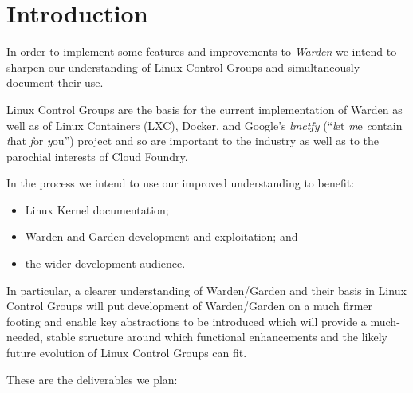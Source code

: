 \documentclass[a4paper,twoside,12pt]{article}
\begin{document}
\section{Introduction}

In order to implement some features and improvements to \emph{Warden} we intend to sharpen our understanding of Linux Control Groups and simultaneously document their use.

Linux Control Groups are the basis for the current implementation of Warden as well as of Linux Containers (LXC), Docker, and Google's
\textit{lmctfy} (``\emph{l}et \emph{m}e \emph{c}ontain \emph{t}hat \emph{f}or \emph{y}ou'') project and so are important to the industry as well as to the parochial interests of Cloud
Foundry.

In the process we intend to use our improved understanding to benefit:
\begin{itemize}
\item Linux Kernel documentation;
\item Warden \cite{warden} and Garden \cite{garden} development and exploitation; and
\item the wider development audience.
\end{itemize}
In particular, a clearer understanding of Warden/Garden and their basis in Linux Control Groups will put development of Warden/Garden
on a much firmer footing and enable key abstractions to be introduced which will provide a much-needed, stable structure around which
functional enhancements and the likely future evolution of Linux Control Groups can fit.

These are the deliverables we plan:
\end{document}

